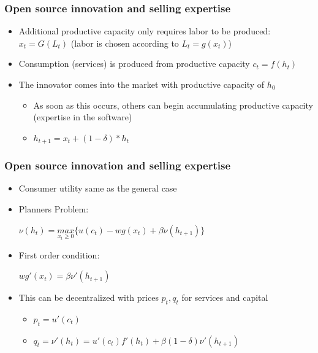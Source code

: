 \documentclass{beamer}
\begin{document}
\begin{frame}
  \frametitle{Open source innovation and selling expertise}
  \begin{itemize}
    \item Additional productive capacity only requires labor to be produced: $x_t = G(L_t)$ (labor is chosen according to $L_t = g(x_t)$)
    \item Consumption (services) is produced from productive capacity $c_t = f(h_t)$
    \item The innovator comes into the market with productive capacity of $h_0$
    \begin{itemize}
      \item As soon as this occurs, others can begin accumulating productive capacity (expertise in the software)
      \item $h_{t+1} = x_t + (1-\delta)*h_t$
    \end{itemize}
  \end{itemize}
\end{frame}

\begin{frame}[t]\frametitle{Open source innovation and selling expertise}
  \begin{itemize}
    \item Consumer utility same as the general case
    \item Planners Problem:\\ 
    \begin{centering}
      $\nu(h_t) = \underset{x_t \ge 0}{max} \{u(c_t) - wg(x_t) + \beta\nu(h_{t+1})\}$
    \end{centering}
    \item First order condition:\\
    \begin{centering}
      $wg'(x_t) = \beta\nu'(h_{t+1})$
    \end{centering}
    \item This can be decentralized with prices ${p_t, q_t}$ for services and capital
    \begin{itemize}
    \item $p_t = u'(c_t)$
    \item $q_t = \nu'(h_t) = u'(c_t)f'(h_t) + \beta(1-\delta)\nu'(h_{t+1})$ 
    \end{itemize} 
  \end{itemize}
\end{frame}
\end{document}
